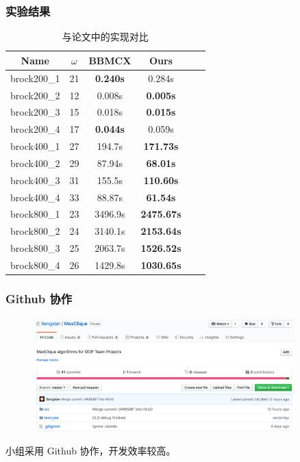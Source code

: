 \documentclass[slidestop,compress,mathserif]{beamer}
\begin{document}
	
	\begin{frame}
\frametitle {实验结果}
\vspace{1em}
	\begin{adjustwidth}{-2em}{-2em}
		\begin{table}[H]
	\begin{center}
		\begin{tabular}{c|c|c|c|c|c}
			\textbf{Name} & $\omega$ & \textbf{BBMCX} & \textbf{Ours}\\
			\hline
brock200\_1 & 21 & \textbf{0.240s} & 0.284s \\
brock200\_2 & 12 & 0.008s & \textbf{0.005s} \\
brock200\_3 & 15 & 0.018s & \textbf{0.015s} \\
brock200\_4 & 17 & \textbf{0.044s} & 0.059s \\
brock400\_1 & 27 & 194.7s & \textbf{171.73s} \\
brock400\_2 & 29 & 87.94s & \textbf{68.01s} \\
brock400\_3 & 31 & 155.5s & \textbf{110.60s} \\
brock400\_4 & 33 & 88.87s & \textbf{61.54s} \\
brock800\_1 & 23 & 3496.9s  & \textbf{2475.67s} \\
brock800\_2 & 24 & 3140.1s & \textbf{2153.64s} \\
brock800\_3 & 25 & 2063.7s & \textbf{1526.52s} \\
brock800\_4 & 26 & 1429.8s & \textbf{1030.65s}
		\end{tabular}
		\caption{与论文中的实现对比}
	\end{center}
		\end{table}
	\end{adjustwidth}
	\end{frame}
	
	\begin{frame}
		\frametitle {Github 协作}
		\begin{figure}[H]
		\centering
		\includegraphics[width=0.9\textwidth]{./github.png}
		\end{figure}
		小组采用 Github 协作，开发效率较高。
	\end{frame}
\end{document}
